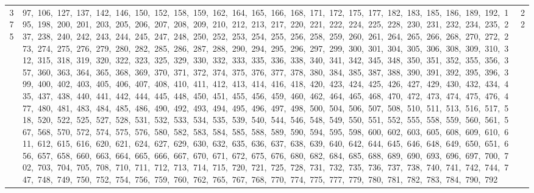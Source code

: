 \begin{longtable}{c|p{}|r}
375 & 97,\ 106,\ 127,\ 137,\ 142,\ 146,\ 150,\ 152,\ 158,\ 159,\ 162,\ 164,\ 165,\ 166,\ 168,\ 171,\ 172,\ 175,\ 177,\ 182,\ 183,\ 185,\ 186,\ 189,\ 192,\ 195,\ 198,\ 200,\ 201,\ 203,\ 205,\ 206,\ 207,\ 208,\ 209,\ 210,\ 212,\ 213,\ 217,\ 220,\ 221,\ 222,\ 224,\ 225,\ 228,\ 230,\ 231,\ 232,\ 234,\ 235,\ 237,\ 238,\ 240,\ 242,\ 243,\ 244,\ 245,\ 247,\ 248,\ 250,\ 252,\ 253,\ 254,\ 255,\ 256,\ 258,\ 259,\ 260,\ 261,\ 264,\ 265,\ 266,\ 268,\ 270,\ 272,\ 273,\ 274,\ 275,\ 276,\ 279,\ 280,\ 282,\ 285,\ 286,\ 287,\ 288,\ 290,\ 294,\ 295,\ 296,\ 297,\ 299,\ 300,\ 301,\ 304,\ 305,\ 306,\ 308,\ 309,\ 310,\ 312,\ 315,\ 318,\ 319,\ 320,\ 322,\ 323,\ 325,\ 329,\ 330,\ 332,\ 333,\ 335,\ 336,\ 338,\ 340,\ 341,\ 342,\ 345,\ 348,\ 350,\ 351,\ 352,\ 355,\ 356,\ 357,\ 360,\ 363,\ 364,\ 365,\ 368,\ 369,\ 370,\ 371,\ 372,\ 374,\ 375,\ 376,\ 377,\ 378,\ 380,\ 384,\ 385,\ 387,\ 388,\ 390,\ 391,\ 392,\ 395,\ 396,\ 399,\ 400,\ 402,\ 403,\ 405,\ 406,\ 407,\ 408,\ 410,\ 411,\ 412,\ 413,\ 414,\ 416,\ 418,\ 420,\ 423,\ 424,\ 425,\ 426,\ 427,\ 429,\ 430,\ 432,\ 434,\ 435,\ 437,\ 438,\ 440,\ 441,\ 442,\ 444,\ 445,\ 448,\ 450,\ 451,\ 455,\ 456,\ 459,\ 460,\ 462,\ 464,\ 465,\ 468,\ 470,\ 472,\ 473,\ 474,\ 475,\ 476,\ 477,\ 480,\ 481,\ 483,\ 484,\ 485,\ 486,\ 490,\ 492,\ 493,\ 494,\ 495,\ 496,\ 497,\ 498,\ 500,\ 504,\ 506,\ 507,\ 508,\ 510,\ 511,\ 513,\ 516,\ 517,\ 518,\ 520,\ 522,\ 525,\ 527,\ 528,\ 531,\ 532,\ 533,\ 534,\ 535,\ 539,\ 540,\ 544,\ 546,\ 548,\ 549,\ 550,\ 551,\ 552,\ 555,\ 558,\ 559,\ 560,\ 561,\ 567,\ 568,\ 570,\ 572,\ 574,\ 575,\ 576,\ 580,\ 582,\ 583,\ 584,\ 585,\ 588,\ 589,\ 590,\ 594,\ 595,\ 598,\ 600,\ 602,\ 603,\ 605,\ 608,\ 609,\ 610,\ 611,\ 612,\ 615,\ 616,\ 620,\ 621,\ 624,\ 627,\ 629,\ 630,\ 632,\ 635,\ 636,\ 637,\ 638,\ 639,\ 640,\ 642,\ 644,\ 645,\ 646,\ 648,\ 649,\ 650,\ 651,\ 656,\ 657,\ 658,\ 660,\ 663,\ 664,\ 665,\ 666,\ 667,\ 670,\ 671,\ 672,\ 675,\ 676,\ 680,\ 682,\ 684,\ 685,\ 688,\ 689,\ 690,\ 693,\ 696,\ 697,\ 700,\ 702,\ 703,\ 704,\ 705,\ 708,\ 710,\ 711,\ 712,\ 713,\ 714,\ 715,\ 720,\ 721,\ 725,\ 728,\ 731,\ 732,\ 735,\ 736,\ 737,\ 738,\ 740,\ 741,\ 742,\ 744,\ 747,\ 748,\ 749,\ 750,\ 752,\ 754,\ 756,\ 759,\ 760,\ 762,\ 765,\ 767,\ 768,\ 770,\ 774,\ 775,\ 777,\ 779,\ 780,\ 781,\ 782,\ 783,\ 784,\ 790,\ 792 & 22 \\

\end{longtable}
